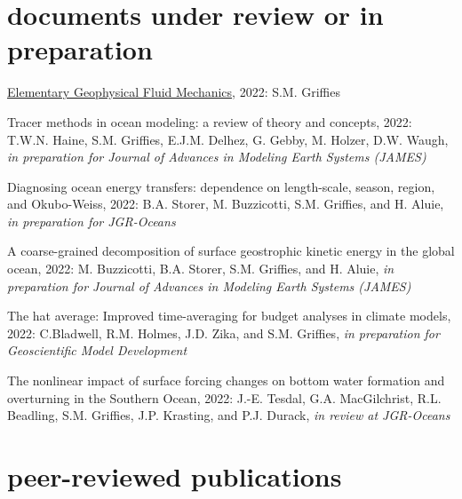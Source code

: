 \section*{\sc \color{Maroon} documents under review or in preparation}

\small 


\begin{etaremune}

\item \href{https://stephengriffies.github.io/assets/pdfs/GFM_lectures.pdf}{Elementary Geophysical Fluid Mechanics}, 2022: S.M. Grif\/f\/ies

\item Tracer methods in ocean modeling: a review of theory and concepts, 2022: T.W.N. Haine, S.M. Grif\/f\/ies, E.J.M. Delhez, G. Gebby, M. Holzer, D.W. Waugh, {\it in preparation for Journal of Advances in Modeling Earth Systems (JAMES)}

\item Diagnosing ocean energy transfers: dependence on length-scale, season, region, and Okubo-Weiss, 2022: B.A. Storer, M. Buzzicotti, S.M. Grif\/f\/ies, and H. Aluie, {\it in preparation for JGR-Oceans}

\item A coarse-grained decomposition of surface geostrophic kinetic energy in the global ocean, 2022: M. Buzzicotti, B.A. Storer, S.M. Grif\/f\/ies, and H. Aluie,  {\it in preparation for Journal of Advances in Modeling Earth Systems (JAMES)}

\item The hat average: Improved time-averaging for budget analyses in climate models, 2022: C.Bladwell,  R.M. Holmes, J.D. Zika, and S.M. Grif\/f\/ies, {\it in preparation for Geoscientific Model Development}

\item The nonlinear impact of surface forcing changes on bottom water formation and overturning in the Southern Ocean, 2022: J.-E. Tesdal, G.A. MacGilchrist, R.L. Beadling, S.M. Grif\/f\/ies, J.P. Krasting, and P.J. Durack, {\it in review at JGR-Oceans}


\end{etaremune}


\section*{\sc \color{Maroon} peer-reviewed publications}

